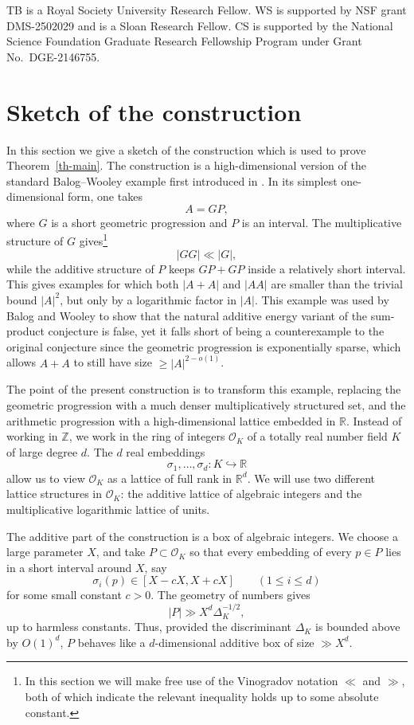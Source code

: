 \documentclass{amsart}
\numberwithin{equation}{section}
\newcommand{\abs}[1]{\mathopen{}\left| #1\mathclose{}\right|}
\begin{document}
TB is a Royal Society University Research Fellow. 
WS is supported by NSF grant DMS-2502029 and is a Sloan Research Fellow. 
CS is supported by the National Science Foundation Graduate Research Fellowship Program under Grant No.~DGE-2146755.

\section{Sketch of the construction}
In this section we give a sketch of the construction which is used to prove Theorem~\ref{th-main}. The construction is a high-dimensional version of the standard Balog--Wooley 
example first introduced in \cite{BalogWooleyLowEnergy}.  In its simplest one-dimensional form, one takes
\[
        A=GP,
\]
where \(G\) is a short geometric progression and \(P\) is an interval.  The
multiplicative structure of \(G\) gives\footnote{In this section we will make free use of the Vinogradov notation $\ll$ and $\gg$, both of which indicate the relevant inequality holds up to some absolute constant.}
\[
        \abs{GG}\ll \abs{G},
\]
while the additive structure of \(P\) keeps \(GP+GP\) inside a relatively short
interval.  This gives examples for which both \(\abs{A+A}\) and \(\abs{AA}\) are
smaller than the trivial bound \(\abs{A}^{2}\), but only by a logarithmic factor
in \(\abs{A}\).  This example was used by Balog and Wooley \cite{BalogWooleyLowEnergy} to show that the natural additive energy variant of the sum-product conjecture is false, yet it falls short of being a counterexample to the original conjecture since the geometric progression is exponentially sparse, which allows $A+A$ to still have size $\geq \abs{A}^{2-o(1)}$.

The point of the present construction is to transform this example, replacing the geometric progression with a much denser multiplicatively structured set, and the arithmetic progression with a high-dimensional lattice embedded in \(\mathbb R\).  Instead of working in \(\mathbb Z\), we work in the ring of integers
\(\mathcal O_K\) of a totally real number field \(K\) of large degree \(d\).  The
\(d\) real embeddings
\[
        \sigma_1,\ldots,\sigma_d\colon K\hookrightarrow \mathbb R
\]
allow us to view \(\mathcal O_K\) as a lattice of full rank in \(\mathbb R^d\).  We will
use two different lattice structures in \(\mathcal O_K\): the additive lattice
of algebraic integers and the multiplicative logarithmic lattice of units.

The additive part of the construction is a box of algebraic integers.  We choose
a large parameter \(X\), and take \(P\subset \mathcal O_K\) so that every
embedding of every \(p\in P\) lies in a short interval around \(X\), say
\[
        \sigma_i(p)\in [X-cX,X+cX]\qquad(1\leq i\leq d)
\]
for some small constant $c>0$. The geometry of numbers gives
\[
        \abs{P}\gg X^d\Delta_K^{-1/2},
\]
up to harmless constants. Thus, provided the discriminant $\Delta_K$ is bounded above by $O(1)^d$, \(P\) behaves like a \(d\)-dimensional additive box of size $\gg X^d$.
\end{document}
